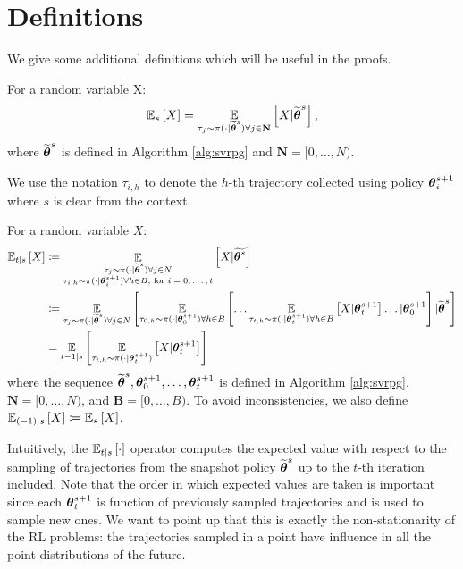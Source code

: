 \section{Definitions}\label{sec:definition}

We give some additional definitions which will be useful in the proofs.

\begin{definition}
	For a random variable X:
	\[
	\Es{X} = \EVV[\tau_j\sim\pi(\cdot\vert\wt{\vtheta}^s)
	\forall j\in\mathbf{N}]{X\vert\wt{\vtheta}^s},
	\]
	where $\wt{\vtheta}^s$ is defined in Algorithm \ref{alg:svrpg} and $\mathbf{N} = [0,\dots,N)$.
\end{definition}

We use the notation $\tau_{i,h}$ to denote the $h$-th trajectory collected using policy $\vtheta^{s+1}_i$ where $s$ is clear from the context.

\begin{definition}
	For a random variable $X$:
	\begin{align*}
	\mathbb{E}_{t\vert s}\left[X\right] &\coloneqq 
	\mathop{\mathbb{E}}_{\substack{\tau_j\sim\pi(\cdot\vert\wt{\vtheta}^s)\forall j \in N \\ \tau_{i,h}\sim\pi(\cdot\vert\vtheta^{s+1}_i) \forall h \in B, \text{ for $i=0,\dots,t$}}}{\left[X \vert \wt{\vtheta^s}\right]} \\
	&\coloneqq \EVV[\tau_j\sim\pi(\cdot\vert\wt{\vtheta}^s)\forall j \in N]{
		\EVV[\tau_{0,h}\sim\pi(\cdot\vert\vtheta_0^{s+1}) \forall h \in B]
		{\dots
			\EVV[\tau_{t,h}\sim\pi(\cdot\vert\vtheta_t^{s+1})\forall h \in B]
			{X\vert\vtheta_t^{s+1}}
			\dots
			\vert\vtheta_0^{s+1}}
		\vert\wt{\vtheta}^s}\\
	&= \EVV[t-1|s]{\EVV[\tau_{t,h}\sim \pi(\cdot|\vtheta^{s+1}_t)]{X|\vtheta^{s+1}_t}}
	\end{align*}
	where the sequence $\wt{\vtheta}^s,\vtheta_0^{s+1},\dots,\vtheta_t^{s+1}$ is defined in Algorithm \ref{alg:svrpg}, $\mathbf{N} = [0,\dots,N)$, and $\mathbf{B} = [0,\dots,B)$. To avoid inconsistencies, we also define $\Ets[(-1)]{X} \coloneqq \Es{X}$.
	
\end{definition}

Intuitively, the $\Ets{\cdot}$ operator computes the expected value with respect to the sampling of trajectories from the snapshot policy $\wt{\vtheta}^s$ up to the $t$-th iteration included. Note that the order in which expected values are taken is important since each $\vtheta_{t}^{s+1}$ is function of previously sampled trajectories and is used to sample new ones.
We want to point up that this is exactly the non-stationarity of the \acs{RL} problems: the trajectories sampled in a point have influence in all the point distributions of the future.


